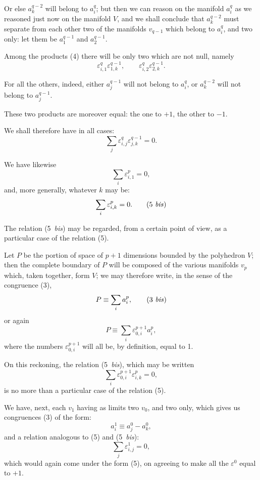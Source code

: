 \documentclass{article}
\begin{document}
Or else $a^{q-2}_{k}$ will belong to $a^{q}_{i}$; but then we can reason on the manifold $a^{q}_{i}$ as we reasoned just now on the manifold $V$, and we shall conclude that $a^{q-2}_{k}$ must separate from each other two of the manifolds $v_{q-1}$ which belong to $a^{q}_{i}$, and two only: let them be $a^{q-1}_{1}$ and $a^{q-1}_{2}$.

Among the products (4) there will be only two which are not null, namely
\[ \varepsilon^{q}_{i,1} \varepsilon^{q-1}_{1,k}, \qquad \varepsilon^{q}_{i,2} \varepsilon^{q-1}_{2,k}. \]

For all the others, indeed, either $a^{q-1}_{j}$ will not belong to $a^{q}_{i}$, or $a^{q-2}_{k}$ will not belong to $a^{q-1}_{j}$.

These two products are moreover equal: the one to $+1$, the other to $-1$.

We shall therefore have in all cases:
\[ \sum_{j} \varepsilon^{q}_{i,j} \varepsilon^{q-1}_{j,k} = 0. \tag{5} \]


We have likewise
\[ \sum_{i} \varepsilon^{p}_{i,1} = 0, \]
and, more generally, whatever $k$ may be:
\[ \sum_{i} \varepsilon^{p}_{i,k} = 0. \tag{5 \textit{bis}} \]

The relation (5~\emph{bis}) may be regarded, from a certain point of view, as a particular case of the relation (5).

Let $P$ be the portion of space of $p+1$ dimensions bounded by the polyhedron $V$; then the complete boundary of $P$ will be composed of the various manifolds $v_{p}$ which, taken together, form $V$; we may therefore write, in the sense of the congruence (3),
\[ P \equiv \sum_{i} a^{p}_{i}, \tag{3 \textit{bis}} \]
or again
\[ P \equiv \sum_{i} \varepsilon^{p+1}_{0,i} a^{p}_{i}, \]
where the numbers $\varepsilon^{p+1}_{0,i}$ will all be, by definition, equal to 1.

On this reckoning, the relation (5~\emph{bis}), which may be written
\[ \sum_{i} \varepsilon^{p+1}_{0,i} \varepsilon^{p}_{i,k} = 0, \]
is no more than a particular case of the relation (5).

We have, next, each $v_{1}$ having as limits two $v_{0}$, and two only, which gives us congruences (3) of the form:
\[ a^{1}_{i} \equiv a^{0}_{j} - a^{0}_{k}, \]
and a relation analogous to (5) and (5~\emph{bis}):
\[ \sum_{j} \varepsilon^{1}_{i,j} = 0, \]
which would again come under the form (5), on agreeing to make all the $\varepsilon^{0}$ equal to $+1$.
\end{document}
